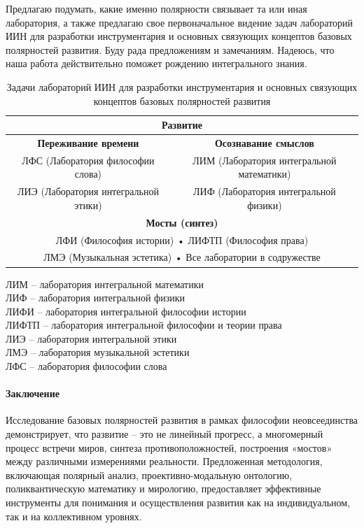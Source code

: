     Предлагаю подумать, какие именно полярности связывает та или иная лаборатория, а также предлагаю свое первоначальное видение задач лабораторий ИИН для разработки инструментария и основных связующих концептов базовых полярностей развития. Буду рада предложениям и замечаниям. Надеюсь, что наша работа действительно поможет рождению интегрального знания.

    \begin{table}[ht!]
    \centering
    \caption{Задачи лабораторий ИИН для разработки инструментария и основных связующих концептов базовых полярностей развития}
    \begin{tabular}{|c|c|}
    \hline
    \multicolumn{2}{|c|}{\textbf{Развитие}} \\
    \hline
    \textbf{Переживание времени} & \textbf{Осознавание смыслов} \\
    \hline
    ЛФС (Лаборатория философии слова) & ЛИМ (Лаборатория интегральной математики) \\
    \hline
    ЛИЭ (Лаборатория интегральной этики) & ЛИФ (Лаборатория интегральной физики) \\
    \hline
    \multicolumn{2}{|c|}{\textbf{Мосты (синтез)}} \\
    \hline
    \multicolumn{2}{|c|}{ЛФИ (Философия истории) • ЛИФТП (Философия права)} \\
    \hline
    \multicolumn{2}{|c|}{ЛМЭ (Музыкальная эстетика) • Все лаборатории в содружестве} \\
    \hline
    \end{tabular}
    \end{table}

    ЛИМ – лаборатория интегральной математики\\
    ЛИФ – лаборатория интегральной физики\\
    ЛИФИ – лаборатория интегральной философии истории\\
    ЛИФТП – лаборатория интегральной философии и теории права\\
    ЛИЭ – лаборатория интегральной этики\\
    ЛМЭ – лаборатория музыкальной эстетики\\
    ЛФС – лаборатория философии слова

    \paragraph*{Заключение}
    Исследование базовых полярностей развития в рамках философии неовсеединства демонстрирует, что развитие – это не линейный прогресс, а многомерный процесс встречи миров, синтеза противоположностей, построения «мостов» между различными измерениями реальности. Предложенная методология, включающая полярный анализ, проективно-модальную онтологию, поликвантическую математику и мирологию, предоставляет эффективные инструменты для понимания и осуществления развития как на индивидуальном, так и на коллективном уровнях.

